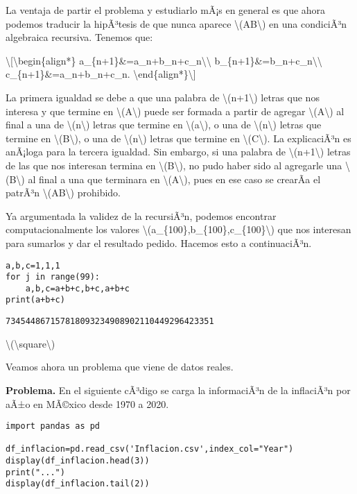 La ventaja de partir el problema y estudiarlo mÃ¡s en general es que
ahora podemos traducir la hipÃ³tesis de que nunca aparece
{\textbackslash(AB\textbackslash)} en una condiciÃ³n algebraica
recursiva. Tenemos que:

\textbackslash{[}\textbackslash begin\{align*\}
a\_\{n+1\}\&=a\_n+b\_n+c\_n\textbackslash\textbackslash{}
b\_\{n+1\}\&=b\_n+c\_n\textbackslash\textbackslash{}
c\_\{n+1\}\&=a\_n+b\_n+c\_n.
\textbackslash end\{align*\}\textbackslash{]}

La primera igualdad se debe a que una palabra de
{\textbackslash(n+1\textbackslash)} letras que nos interesa y que
termine en {\textbackslash(A\textbackslash)} puede ser formada a partir
de agregar {\textbackslash(A\textbackslash)} al final a una de
{\textbackslash(n\textbackslash)} letras que termine en
{\textbackslash(a\textbackslash)}, o una de
{\textbackslash(n\textbackslash)} letras que termine en
{\textbackslash(B\textbackslash)}, o una de
{\textbackslash(n\textbackslash)} letras que termine en
{\textbackslash(C\textbackslash)}. La explicaciÃ³n es anÃ¡loga para la
tercera igualdad. Sin embargo, si una palabra de
{\textbackslash(n+1\textbackslash)} letras de las que nos interesan
termina en {\textbackslash(B\textbackslash)}, no pudo haber sido al
agregarle una {\textbackslash(B\textbackslash)} al final a una que
terminara en {\textbackslash(A\textbackslash)}, pues en ese caso se
crearÃ­a el patrÃ³n {\textbackslash(AB\textbackslash)} prohibido.

Ya argumentada la validez de la recursiÃ³n, podemos encontrar
computacionalmente los valores
{\textbackslash(a\_\{100\},b\_\{100\},c\_\{100\}\textbackslash)} que nos
interesan para sumarlos y dar el resultado pedido. Hacemos esto a
continuaciÃ³n.

\begin{verbatim}
a,b,c=1,1,1
for j in range(99):
    a,b,c=a+b+c,b+c,a+b+c
print(a+b+c)
\end{verbatim}

\begin{verbatim}
734544867157818093234908902110449296423351
\end{verbatim}

{{\textbackslash(\textbackslash square\textbackslash)}}

Veamos ahora un problema que viene de datos reales.

\textbf{Problema.} En el siguiente cÃ³digo se carga la informaciÃ³n de
la inflaciÃ³n por aÃ±o en MÃ©xico desde 1970 a 2020.

\begin{verbatim}
import pandas as pd

df_inflacion=pd.read_csv('Inflacion.csv',index_col="Year")
display(df_inflacion.head(3))
print("...")
display(df_inflacion.tail(2))
\end{verbatim}

